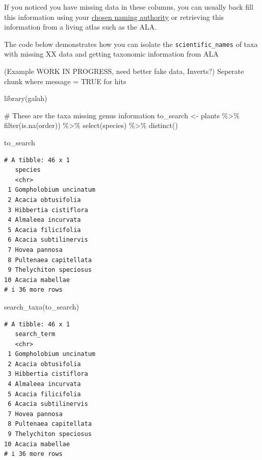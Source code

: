 \documentclass[
  letterpaper,
  DIV=11,
  numbers=noendperiod,
  oneside]{scrreprt}
\newenvironment{Shaded}{\begin{snugshade}}{\end{snugshade}}
\newcommand{\CommentTok}[1]{\textcolor[rgb]{0.37,0.37,0.37}{#1}}
\newcommand{\FunctionTok}[1]{\textcolor[rgb]{0.28,0.35,0.67}{#1}}
\newcommand{\NormalTok}[1]{\textcolor[rgb]{0.00,0.23,0.31}{#1}}
\newcommand{\OtherTok}[1]{\textcolor[rgb]{0.00,0.23,0.31}{#1}}
\newcommand{\SpecialCharTok}[1]{\textcolor[rgb]{0.37,0.37,0.37}{#1}}
\begin{document}
If you noticed you have missing data in these columns, you can usually
back fill this information using your
\href{link\%20back\%20to\%20section}{chosen naming authority} or
retrieving this information from a living atlas such as the ALA.

The code below demonstrates how you can isolate the
\texttt{scientific\_names} of taxa with missing XX data and getting
taxonomic information from ALA

(Example WORK IN PROGRESS, need better fake data, Inverts?) Seperate
chunk where message = TRUE for hits

\begin{Shaded}
\begin{Highlighting}[]
\FunctionTok{library}\NormalTok{(galah)}

\CommentTok{\# These are the taxa missing \textasciigrave{}genus\textasciigrave{} information}
\NormalTok{to\_search }\OtherTok{\textless{}{-}}\NormalTok{ plants }\SpecialCharTok{\%\textgreater{}\%} 
  \FunctionTok{filter}\NormalTok{(}\FunctionTok{is.na}\NormalTok{(order)) }\SpecialCharTok{\%\textgreater{}\%} 
  \FunctionTok{select}\NormalTok{(species) }\SpecialCharTok{\%\textgreater{}\%} 
  \FunctionTok{distinct}\NormalTok{()}

\NormalTok{to\_search}
\end{Highlighting}
\end{Shaded}

\begin{verbatim}
# A tibble: 46 x 1
   species               
   <chr>                 
 1 Gompholobium uncinatum
 2 Acacia obtusifolia    
 3 Hibbertia cistiflora  
 4 Almaleea incurvata    
 5 Acacia filicifolia    
 6 Acacia subtilinervis  
 7 Hovea pannosa         
 8 Pultenaea capitellata 
 9 Thelychiton speciosus 
10 Acacia mabellae       
# i 36 more rows
\end{verbatim}

\begin{Shaded}
\begin{Highlighting}[]
\FunctionTok{search\_taxa}\NormalTok{(to\_search)}
\end{Highlighting}
\end{Shaded}

\begin{verbatim}
# A tibble: 46 x 1
   search_term           
   <chr>                 
 1 Gompholobium uncinatum
 2 Acacia obtusifolia    
 3 Hibbertia cistiflora  
 4 Almaleea incurvata    
 5 Acacia filicifolia    
 6 Acacia subtilinervis  
 7 Hovea pannosa         
 8 Pultenaea capitellata 
 9 Thelychiton speciosus 
10 Acacia mabellae       
# i 36 more rows
\end{verbatim}
\end{document}
